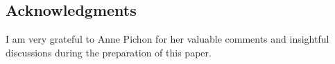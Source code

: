 \documentclass[reqno,dvipsnames,12pt]{amsart}
\begin{document}


\subsection*{Acknowledgments}
 I am very grateful to Anne Pichon for her valuable comments and insightful discussions during the preparation of this paper.
\end{document}
